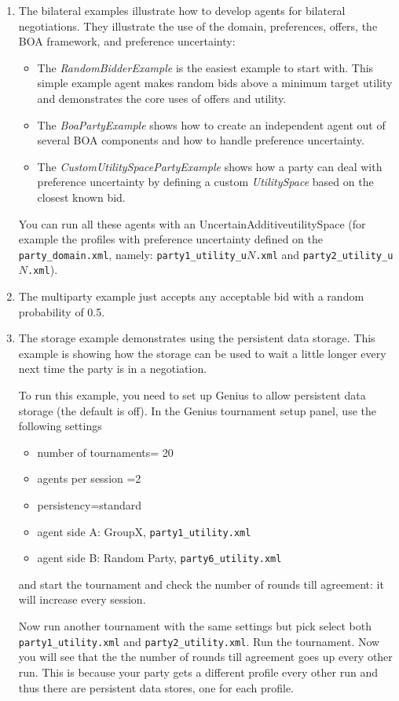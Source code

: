 \documentclass[]{article}
\newcommand\Genius{{\sc Genius}}
\begin{document}
\begin{enumerate}
	
\item The bilateral examples illustrate how to develop agents for bilateral negotiations. They illustrate the use of the domain, preferences, offers, the BOA framework, and preference uncertainty:
\begin{itemize}
	\item  The \textit{RandomBidderExample} is the easiest example to start with. This simple example agent makes random bids above a minimum target utility and demonstrates the core uses of offers and utility.
	\item  The \textit{BoaPartyExample} shows how to create an independent agent out of several BOA components and how to handle preference uncertainty.
	\item  The \textit{CustomUtilitySpacePartyExample} shows how a party can deal with preference uncertainty by defining a custom \textit{UtilitySpace} based on the closest known bid.
\end{itemize}

You can run all these agents with an UncertainAdditiveutilitySpace (for example the profiles with preference uncertainty defined on the \verb|party_domain.xml|, namely: \verb|party1_utility_u|$N$\verb|.xml| and \verb|party2_utility_u|$N$\verb|.xml|).
	
\item The multiparty example just accepts any acceptable bid with a random probability of 0.5.

\item The storage example demonstrates using the persistent data storage. This example is showing how the storage can be used to wait a little longer every next time the party is in a negotiation.

To run this example, you need to set up {\Genius} to allow persistent data storage (the default is off). In the {\Genius} tournament setup panel, use the following settings
\begin{itemize}
\item  number of tournaments= 20
\item  agents per session =2
\item  persistency=standard
\item  agent side A: GroupX, \verb|party1_utility.xml|
\item  agent side B: Random Party, \verb|party6_utility.xml|
\end{itemize}

and start the tournament and check the number of rounds till agreement: it will increase every session.

Now run another tournament with the same settings but pick select both \verb|party1_utility.xml| and \verb|party2_utility.xml|. Run the tournament.
Now you will see that the the number of rounds till agreement goes up every other run. This is because your party gets a different profile every other run and thus there are persistent data stores, one for each profile. 



\end{enumerate}
\end{document}
